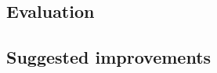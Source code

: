 \documentclass[11pt, letterpaper]{article}
\begin{document}

\subsection{Evaluation}



\subsection{Suggested improvements}




\end{document}
